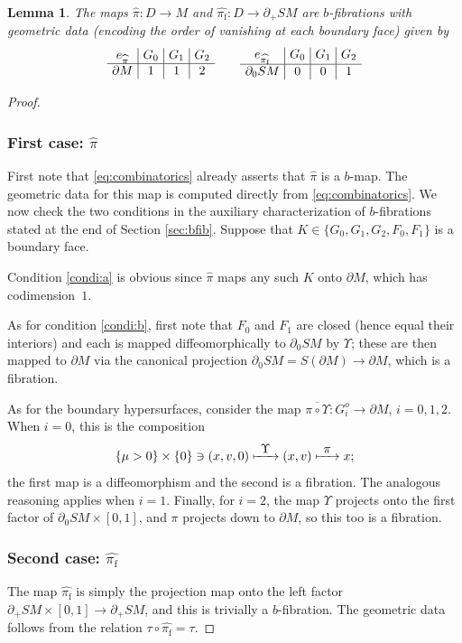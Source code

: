 \documentclass[11pt]{article}
\newcommand{\skpt}{\smallskip}
\def\To#1{\mathchoice{\xrightarrow{\textstyle\kern4pt#1\kern3pt}}{\stackrel{#1}{\longrightarrow}}{}{}}
\def\Mto#1{\mathrel{\mapstochar\To{#1}}}
\theoremstyle{plain}
\newtheorem{Lemma}[Theorem]{Lemma}
\theoremstyle{definition}
\theoremstyle{remark}
\newcommand{\hpi}{\widehat{\pi}}
\newcommand{\del}{\partial}
\newcommand{\foot}{{\pi_{\mathrm f}}}
\newcommand{\hF}{\widehat{\foot}}
\begin{document}
\begin{Lemma}\label{lem:bfibrations}
The maps $\hpi\colon D\to M$ and $\hF\colon D\to \partial_+ SM$ are $b$-fibrations with geometric data (encoding
the order of vanishing at each boundary face) given by\vspace*{-3pt}
\begin{equation*}\arraycolsep4pt
\begin{array}{c|c|c|c}
e_{\hpi} & G_0 & G_1 & G_2 \\
\hline
\partial M & 1 & 1 & 2
\end{array}
\qquad
\begin{array}{c|c|c|c}
e_{\hF} & G_0 & G_1 & G_2 \\
\hline
\partial_0 SM & 0 & 0 & 1
\end{array}
\end{equation*}
\end{Lemma}

\skpt
\begin{proof}\vspace*{-3pt}
\subsubsection*{First case: $\hpi$}
First note that \eqref{eq:combinatorics} already asserts that $\hpi$ is a $b$-map.
The geometric data for this map is computed directly from \eqref{eq:combinatorics}. We now check the two
conditions in the auxiliary characterization of $b$-fibrations stated at the end of Section \ref{sec:bfib}. Suppose that $K \in \{G_0, G_1, G_2, F_0, F_1\}$ is a boundary face.

Condition \eqref{condi:a} is obvious since $\hpi$ maps any such $K$ onto $\del M$, which has codimension~$1$.

As for condition \eqref{condi:b}, first note that $F_0$ and $F_1$ are closed (hence equal their interiors) and each is mapped
diffeomorphically to $\partial_0 SM$ by $\Upsilon$; these are then mapped to $\partial M$ via the canonical projection
$\partial_{0} SM = S (\partial M) \to \partial M$, which is a fibration.

As for the boundary hypersurfaces, consider the map $\overline{\pi\circ\Upsilon} \colon G_i^o \to \partial M$, $i=0,1,2$.
When $i = 0$, this is the composition
\begin{equation*}
\{ \mu>0\}\times \{0\}\ni (x,v,0) \Mto{\Upsilon} (x,v) \Mto{\pi} x;
\end{equation*}
the first map is a diffeomorphism and the second is a fibration. The analogous reasoning applies when $i = 1$. Finally, for $i=2$,
the map $\Upsilon$ projects onto the first factor of $\del_0 SM \times [0,1]$, and $\pi$ projects down to $\partial M$, so this
too is a fibration.

\subsubsection*{Second case: $\hF$}
The map $\hF$ is simply the projection map onto the left factor $\partial_+{SM}\times [0,1]\to \partial_+ SM$, and this
is trivially a $b$-fibration. The geometric data follows from the relation $\tau\circ\hF = \tau$.
\end{proof}
\end{document}

